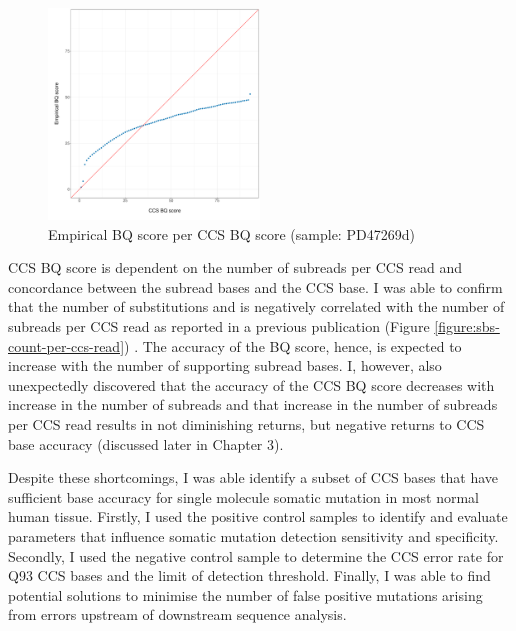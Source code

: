 \begin{figure}[htbp!]
\caption{Empirical BQ score per CCS BQ score (sample: PD47269d)}
\label{figure:empirical-bq-per-bq}
\begin{centering}
\includegraphics[width=0.5\textwidth]{Vector/empirical_bq_per_bq.pdf}
\end{centering}
\end{figure}

CCS BQ score is dependent on the number of subreads per CCS read and concordance between the subread bases and the CCS base. I was able to confirm that the number of substitutions and is negatively correlated with the number of subreads per CCS read as reported in a previous publication (Figure \ref{figure:sbs-count-per-ccs-read}) \cite{Wenger2019-pw}. The accuracy of the BQ score, hence, is expected to increase with the number of supporting subread bases. I, however, also unexpectedly discovered that the accuracy of the CCS BQ score decreases with increase in the number of subreads and that increase in the number of subreads per CCS read results in not diminishing returns, but negative returns to CCS base accuracy (discussed later in Chapter 3). 

Despite these shortcomings, I was able identify a subset of CCS bases that have sufficient base accuracy for single molecule somatic mutation in most normal human tissue. Firstly, I used the positive control samples to identify and evaluate parameters that influence somatic mutation detection sensitivity and specificity. Secondly, I used the negative control sample to determine the CCS error rate for Q93 CCS bases and the limit of detection threshold. Finally, I was able to find potential solutions to minimise the number of false positive mutations arising from errors upstream of downstream sequence analysis. 

